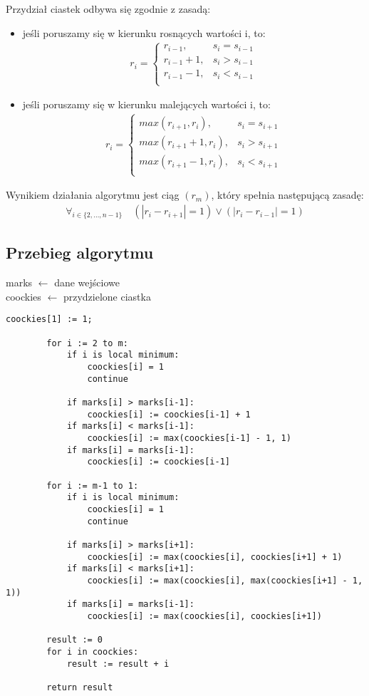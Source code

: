 \documentclass{article}
\begin{document}
	Przydział ciastek odbywa się zgodnie z zasadą:
	\begin{itemize}
		\item jeśli poruszamy się w kierunku rosnących wartości i, to:
			\begin{align*}
				r_i  =
				\begin{cases}
					r_{i-1}, & s_{i} = s_{i-1} \\
					r_{i-1} + 1, & s_{i} > s_{i-1} \\
					r_{i-1} - 1, & s_{i} < s_{i-1} \\
				\end{cases}
			\end{align*}

		\item jeśli poruszamy się w kierunku malejących wartości i, to:
			\begin{align*}
				r_i  =
				\begin{cases}
					max(r_{i+1}, r_{i}), & s_{i} = s_{i+1} \\
					max(r_{i+1} + 1, r_{i}), & s_{i} > s_{i+1} \\
					max(r_{i+1} - 1, r_{i}), & s_{i} < s_{i+1} \\
				\end{cases}
			\end{align*}
	\end{itemize}

	Wynikiem działania algorytmu jest ciąg $(r_{m})$, który spełnia następującą zasadę:
	\begin{align*}
		\forall_{i\in \{2, \ldots, n-1\}}\hspace{1em} (|r_i - r_{i+1}| = 1) \lor (|r_i - r_{i-1}| = 1)
	\end{align*}


	\subsection{Przebieg algorytmu}
	marks $\leftarrow$ dane wejściowe \\
	coockies $\leftarrow$ przydzielone ciastka

	\begin{lstlisting}[tabsize=2]
		coockies[1] := 1;

		for i := 2 to m:
			if i is local minimum:
				coockies[i] = 1
				continue

			if marks[i] > marks[i-1]:
				coockies[i] := coockies[i-1] + 1
			if marks[i] < marks[i-1]:
				coockies[i] := max(coockies[i-1] - 1, 1)
			if marks[i] = marks[i-1]:
				coockies[i] := coockies[i-1]

		for i := m-1 to 1:
			if i is local minimum:
				coockies[i] = 1
				continue

			if marks[i] > marks[i+1]:
				coockies[i] := max(coockies[i], coockies[i+1] + 1)
			if marks[i] < marks[i+1]:
				coockies[i] := max(coockies[i], max(coockies[i+1] - 1, 1))
			if marks[i] = marks[i-1]:
				coockies[i] := max(coockies[i], coockies[i+1])

		result := 0
		for i in coockies:
			result := result + i

		return result
	\end{lstlisting}
\end{document}
